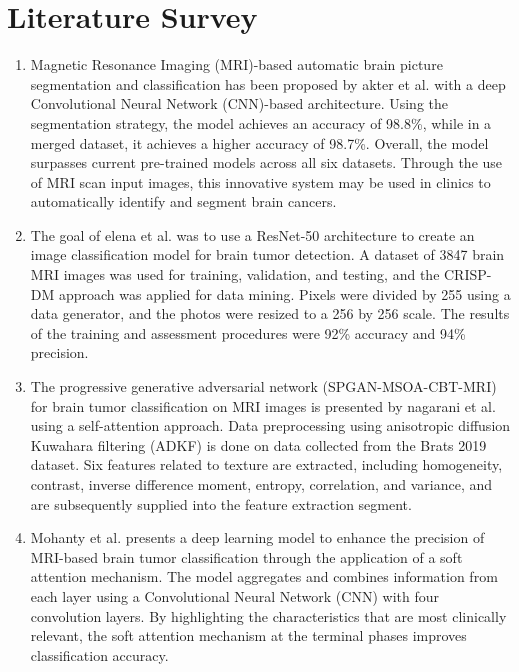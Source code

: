 \documentclass{article}
\begin{document}
\section{Literature Survey}
\begin{enumerate}
    \item Magnetic Resonance Imaging (MRI)-based automatic brain picture segmentation and classification has been proposed by akter et al. \cite{akter2024robust} with a deep Convolutional Neural Network (CNN)-based architecture. Using the segmentation strategy, the model achieves an accuracy of 98.8\%, while in a merged dataset, it achieves a higher accuracy of 98.7\%. Overall, the model surpasses current pre-trained models across all six datasets. Through the use of MRI scan input images, this innovative system may be used in clinics to automatically identify and segment brain cancers.
    
    \item The goal of elena et al. \cite{elena2023brain} was to use a ResNet-50 architecture to create an image classification model for brain tumor detection. A dataset of 3847 brain MRI images was used for training, validation, and testing, and the CRISP-DM approach was applied for data mining. Pixels were divided by 255 using a data generator, and the photos were resized to a 256 by 256 scale. The results of the training and assessment procedures were 92\% accuracy and 94\% precision.
    
    \item The progressive generative adversarial network (SPGAN-MSOA-CBT-MRI) for brain tumor classification on MRI images is presented by nagarani et al. \cite{nagarani2024self} using a self-attention approach. Data preprocessing using anisotropic diffusion Kuwahara filtering (ADKF) is done on data collected from the Brats 2019 dataset. Six features related to texture are extracted, including homogeneity, contrast, inverse difference moment, entropy, correlation, and variance, and are subsequently supplied into the feature extraction segment.
    
    \item Mohanty et al. \cite{mohanty2024feature} presents a deep learning model to enhance the precision of MRI-based brain tumor classification through the application of a soft attention mechanism. The model aggregates and combines information from each layer using a Convolutional Neural Network (CNN) with four convolution layers. By highlighting the characteristics that are most clinically relevant, the soft attention mechanism at the terminal phases improves classification accuracy.
    

\end{enumerate}
\end{document}
